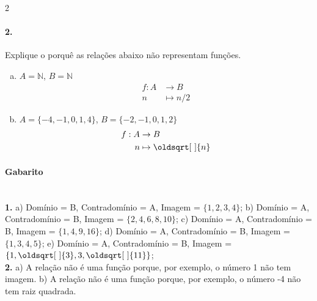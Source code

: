 \documentclass[a4paper,12pt]{article}
\renewcommand*{\sqrt}[2][\ ]{\oldsqrt[#1]{#2}}
\begin{document}
\begin{multicols}{2}
\newcolumn

\paragraph*{2.} Explique o porquê as relações abaixo não representam funções.

\begin{enumerate}[a)]

    \item $A = \mathbb{N}$, $B = \mathbb{N}$
    $$\begin{aligned}
        f:A&\to B\\ 
         n&\mapsto n/2
    \end{aligned}$$

    \item $A = \{-4,-1,0,1,4\}$, $B = \{-2,-1,0,1,2\}$
    $$\begin{aligned}
        f:A&\to B\\ 
            n&\mapsto \sqrt{n}
    \end{aligned}$$
\end{enumerate}



\end{multicols}
 

\vspace*{\fill}
{\footnotesize
\paragraph*{Gabarito} \color{darkgray} \hspace*{\fill}\\
\textbf{1.} a) Domínio = B, Contradomínio = A, Imagem = $\{1,2,3,4\}$; 
b) Domínio = A, Contradomínio = B, Imagem = $\{2,4,6,8,10\}$; 
c) Domínio = A, Contradomínio = B, Imagem = $\{1,4,9,16\}$; 
d) Domínio = A, Contradomínio = B, Imagem = $\{1,3,4,5\}$;
e) Domínio = A, Contradomínio = B, Imagem = $\{1,\sqrt{3},3,\sqrt{11}\}$;\\
\textbf{2.} a) A relação não é uma função porque, por exemplo, o número 1 não tem imagem. b) A relação não é uma função porque, por exemplo, o número -4 não tem raiz quadrada.\\
}
\end{document}

